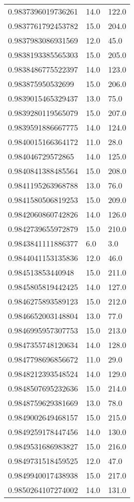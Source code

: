 \begin{center}
\begin{supertabular}[H]{p{0.30\textwidth}p{0.05\textwidth}p{0.05\textwidth}}
0.9837396019736261 & 14.0 & 122.0 \\ 
0.9837761792453782 & 15.0 & 204.0 \\ 
0.9837983086931569 & 12.0 & 45.0 \\ 
0.9838193385565303 & 15.0 & 205.0 \\ 
0.9838486775522397 & 14.0 & 123.0 \\ 
0.983875950532699 & 15.0 & 206.0 \\ 
0.9839015465329437 & 13.0 & 75.0 \\ 
0.9839280119565079 & 15.0 & 207.0 \\ 
0.9839591886667775 & 14.0 & 124.0 \\ 
0.9840015166364172 & 11.0 & 28.0 \\ 
0.984046729572865 & 14.0 & 125.0 \\ 
0.9840841388485564 & 15.0 & 208.0 \\ 
0.9841195263968788 & 13.0 & 76.0 \\ 
0.9841580506819253 & 15.0 & 209.0 \\ 
0.9842060860742826 & 14.0 & 126.0 \\ 
0.9842739655972879 & 15.0 & 210.0 \\ 
0.9843841111886377 & 6.0 & 3.0 \\ 
0.9844041153135836 & 12.0 & 46.0 \\ 
0.984513853440948 & 15.0 & 211.0 \\ 
0.9845805819442425 & 14.0 & 127.0 \\ 
0.9846275893589123 & 15.0 & 212.0 \\ 
0.9846652003148804 & 13.0 & 77.0 \\ 
0.9846995957307753 & 15.0 & 213.0 \\ 
0.9847355748120634 & 14.0 & 128.0 \\ 
0.9847798696856672 & 11.0 & 29.0 \\ 
0.9848212393548524 & 14.0 & 129.0 \\ 
0.9848507695232636 & 15.0 & 214.0 \\ 
0.9848759629381669 & 13.0 & 78.0 \\ 
0.9849002649468157 & 15.0 & 215.0 \\ 
0.9849259178447456 & 14.0 & 130.0 \\ 
0.9849531686983827 & 15.0 & 216.0 \\ 
0.9849731518459525 & 12.0 & 47.0 \\ 
0.9849940017438938 & 15.0 & 217.0 \\ 
0.9850264107274002 & 14.0 & 131.0 \\ 

\end{supertabular}
\end{center}
